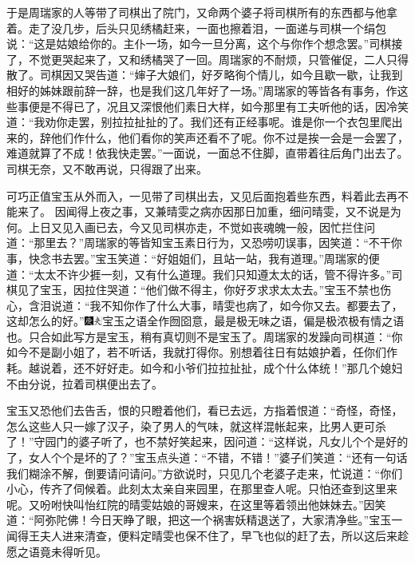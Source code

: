 于是周瑞家的人等带了司棋出了院门，又命两个婆子将司棋所有的东西都与他拿着。走了没几步，后头只见绣橘赶来，一面也擦着泪，一面递与司棋一个绢包说：“这是姑娘给你的。主仆一场，如今一旦分离，这个与你作个想念罢。”司棋接了，不觉更哭起来了，又和绣橘哭了一回。周瑞家的不耐烦，只管催促，二人只得散了。司棋因又哭告道：“婶子大娘们，好歹略徇个情儿，如今且歇一歇，让我到相好的姊妹跟前辞一辞，也是我们这几年好了一场。”周瑞家的等皆各有事务，作这些事便是不得已了，况且又深恨他们素日大样，如今那里有工夫听他的话，因冷笑道：“我劝你走罢，别拉拉扯扯的了。我们还有正经事呢。谁是你一个衣包里爬出来的，辞他们作什么，他们看你的笑声还看不了呢。你不过是挨一会是一会罢了，难道就算了不成！依我快走罢。”一面说，一面总不住脚，直带着往后角门出去了。司棋无奈，又不敢再说，只得跟了出来。

可巧正值宝玉从外而入，一见带了司棋出去，又见后面抱着些东西，料着此去再不能来了。
因闻得上夜之事，又兼晴雯之病亦因那日加重，细问晴雯，又不说是为何。上日又见入画已去，今又见司棋亦走，不觉如丧魂魄一般，因忙拦住问道：“那里去？”周瑞家的等皆知宝玉素日行为，又恐唠叨误事，因笑道：“不干你事，快念书去罢。”宝玉笑道：“好姐姐们，且站一站，我有道理。”周瑞家的便道：“太太不许少捱一刻，又有什么道理。我们只知遵太太的话，管不得许多。”司棋见了宝玉，因拉住哭道：“他们做不得主，你好歹求求太太去。”宝玉不禁也伤心，含泪说道：“我不知你作了什么大事，晴雯也病了，如今你又去。都要去了，这却怎么的好。”{\includegraphics[width=3mm]{../Images/00004}\includegraphics[width=3mm]{../Images/00012}\footnotesize \kaishu 宝玉之语全作囫囵意，最是极无味之语，偏是极浓极有情之语也。只合如此写方是宝玉，稍有真切则不是宝玉了。}周瑞家的发躁向司棋道：“你如今不是副小姐了，若不听话，我就打得你。别想着往日有姑娘护着，任你们作耗。越说着，还不好好走。如今和小爷们拉拉扯扯，成个什么体统！”那几个媳妇不由分说，拉着司棋便出去了。

宝玉又恐他们去告舌，恨的只瞪着他们，看已去远，方指着恨道：“奇怪，奇怪，怎么这些人只一嫁了汉子，染了男人的气味，就这样混帐起来，比男人更可杀了！”守园门的婆子听了，也不禁好笑起来，因问道：“这样说，凡女儿个个是好的了，女人个个是坏的了？”宝玉点头道：“不错，不错！”婆子们笑道：“还有一句话我们糊涂不解，倒要请问请问。”方欲说时，只见几个老婆子走来，忙说道：“你们小心，传齐了伺候着。此刻太太亲自来园里，在那里查人呢。只怕还查到这里来呢。又吩咐快叫怡红院的晴雯姑娘的哥嫂来，在这里等着领出他妹妹去。”因笑道：“阿弥陀佛！今日天睁了眼，把这一个祸害妖精退送了，大家清净些。”宝玉一闻得王夫人进来清查，便料定晴雯也保不住了，早飞也似的赶了去，所以这后来趁愿之语竟未得听见。

